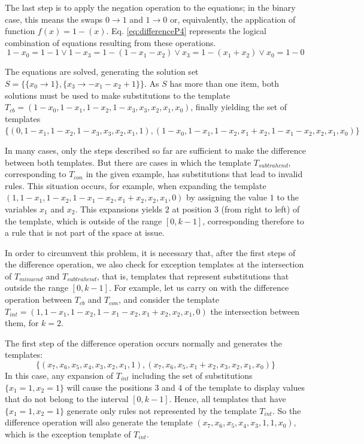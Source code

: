 \documentclass{llncs}
\begin{document}
The last step is to apply the negation operation to the equations; in the binary case, this means the swaps $0 \to 1$ and $1 \to 0$ or, equivalently, the application of function $f(x) = 1 - (x)$. Eq. \ref{eq:differenceP4} represents the logical combination of equations resulting from these operations.
\begin{equation}
1 - x_0 = 1 - 1         \vee 
1 - x_3 = 1 - (1 - x_1 - x_2) \vee
x_3   = 1 - (x_1 + x_2)   \vee 
x_0   = 1 - 0       
\label{eq:differenceP4}
\end{equation}

The equations are solved, generating the solution set $S = \{\{x_0\to 1\},\{x_3\to -x_1-x_2+1\}\}$. As $S$ has more than one item, both solutions must be used to make substitutions to the template $T_{cb} = (1 - x_0, 1 - x_1, 1 - x_2, 1 - x_3, x_3, x_2, x_1, x_0)$, finally yielding the set of templates $\{(0, 1 - x_1, 1 - x_2, 1 - x_3, x_3, x_2, x_1, 1),(1 - x_0, 1 - x_1, 1 - x_2, x_1 + x_2, 1 - x_1 - x_2, x_2, x_1, x_0)\}$

In many cases, only the steps described so far are sufficient to make the difference between both templates. But there are cases in which the template $T_{subtrahend}$, corresponding to $T_{con}$ in the given example, has substitutions that lead to invalid rules. This situation occurs, for example, when expanding the template $(1, 1 - x_1, 1 - x_2, 1 - x_1 - x_2, x_1 + x_2, x_2, x_1, 0)$ by assigning the value $1$ to the variables $x_1$ and $x_2$. This expansions yields $2$ at position $3$ (from right to left) of the template, which is outside of the range $[0, k-1]$, corresponding therefore to a rule that is not part of the space at issue.

In order to circumvent this problem, it is necessary that, after the first steps of the difference operation, we also check for exception templates at the intersection of $T_{minuend}$ and $T_{subtrahend}$, that is, templates that represent substitutions that outside the range $[0,k-1]$. For example, let us carry on with the difference operation between $T_{cb}$ and $T_{con}$, and consider the template $T_{int} = (1, 1 - x_1, 1 - x_2, 1 - x_1 - x_2, x_1 + x_2, x_2, x_1, 0)$ the intersection between them, for $k=2$.

The first step of the difference operation occurs normally and generates the templates: 
\begin{displaymath}
\{(x_7, x_6, x_5, x_4, x_3, x_2, x_1, 1),(x_7, x_6, x_5, x_1 + x_2, x_3, x_2, x_1, x_0)\}
\end{displaymath}
In this case, any expansion of $T_{int}$ including the set of substitutions $\{x_1 = 1, x_2 = 1\}$ will cause the positions $3$ and $4$ of the template to display values that do not belong to the interval $[0,k-1]$.
Hence, all templates that have $\{x_1 = 1, x_2 = 1\}$ generate only rules not represented by the template $T_{int}$. So the difference operation will also generate the template $(x_7, x_6, x_5, x_4, x_3, 1, 1, x_0)$, which is the exception template of $T_{int}$.
\end{document}

